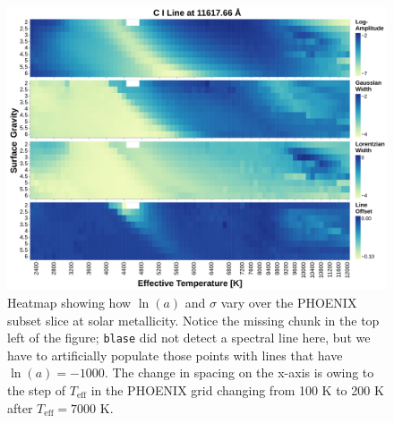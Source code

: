 \documentclass[twocolumn]{aastex631}
\begin{document}
\begin{figure}
    \centering
    \includegraphics[width=\textwidth]{figure3}
    \caption{Heatmap showing how $\ln(a)$ and $\sigma$ vary over the PHOENIX subset
    slice at solar metallicity. Notice the missing chunk in the top left
    of the figure; \texttt{blase} did not detect a spectral line here,
    but we have to artificially populate those points with lines that 
    have $\ln(a) = -1000$. The change in spacing on the x-axis is owing to
    the step of $T_\mathrm{eff}$ in the PHOENIX grid changing from 100 K to 
    200 K after $T_\mathrm{eff} = 7000$ K.}
\end{figure}
\end{document}
